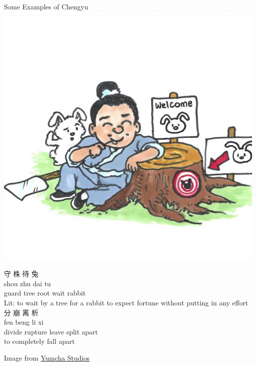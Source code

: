 \documentclass[xetex]{beamer}
\begin{document}
     \begin{frame}{Some Examples of Chengyu}
       \hfill \includegraphics{pics/shouzhudaitu.jpg}
       \vspace{-3cm}
       \begin{exe}
         \ex\label{s:rabbit}
         \glll 守 株 待 兔 \\
         shou zhu dai tu \\
         guard {tree root} wait rabbit \\
         \trans Lit: to wait by a tree for a rabbit
         \trans to expect fortune without putting in any effort
         \ex\label{s:divide}
         \glll 分 崩 离 析 \\
         fen beng li xi \\
         divide rupture leave {split apart} \\
         \trans to completely fall apart
       \end{exe}

Image from \href{https://www.dimsumwarriors.com/chengyu/守株待兔-shouzhudaitu/}{Yumcha Studios}
     \end{frame}
\end{document}
